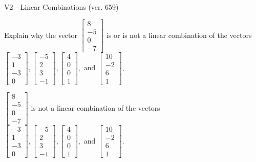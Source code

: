 \begin{exercise}
  \begin{exerciseTitle}V2 - Linear Combinations (ver. 659)\end{exerciseTitle}
  \begin{exerciseStatement}
    Explain why the vector \(\left[\begin{array}{c}
8 \\
-5 \\
0 \\
-7
\end{array}\right]\)  is or is not a linear 
	combination of the vectors \(\left[\begin{array}{c}
-3 \\
1 \\
-3 \\
0
\end{array}\right] , \left[\begin{array}{c}
-5 \\
2 \\
3 \\
-1
\end{array}\right] , \left[\begin{array}{c}
4 \\
0 \\
0 \\
1
\end{array}\right] , \text{ and } \left[\begin{array}{c}
10 \\
-2 \\
6 \\
1
\end{array}\right]\).
	


  \end{exerciseStatement}
  \begin{exerciseAnswer}
   \(\left[\begin{array}{c}
8 \\
-5 \\
0 \\
-7
\end{array}\right]\) 
  	 is not  
	a linear combination of the vectors \(\left[\begin{array}{c}
-3 \\
1 \\
-3 \\
0
\end{array}\right] , \left[\begin{array}{c}
-5 \\
2 \\
3 \\
-1
\end{array}\right] , \left[\begin{array}{c}
4 \\
0 \\
0 \\
1
\end{array}\right] , \text{ and } \left[\begin{array}{c}
10 \\
-2 \\
6 \\
1
\end{array}\right]\).


\end{exerciseAnswer}
\end{exercise}
